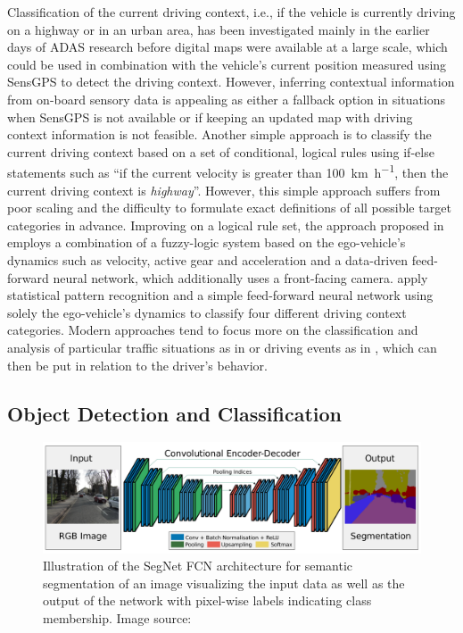Classification of the current driving context, i.e., if the vehicle is currently driving on a highway or in an urban area, has been investigated mainly in the earlier days of \ac{ADAS} research before digital maps were available at a large scale, which could be used in combination with the vehicle's current position measured using \ac{SensGPS} to detect the driving context.
However, inferring contextual information from on-board sensory data is appealing as either a fallback option in situations when \ac{SensGPS} is not available or if keeping an updated map with driving context information is not feasible.
Another simple approach is to classify the current driving context based on a set of conditional, logical rules using if-else statements such as \enquote{if the current velocity is greater than \SI{100}{\kilo\meter\per\hour}, then the current driving context is \emph{highway}}.
However, this simple approach suffers from poor scaling and the difficulty to formulate exact definitions of all possible target categories in advance.
Improving on a logical rule set, the approach proposed in \textcite{Hauptmann1996} employs a combination of a fuzzy-logic system based on the ego-vehicle's dynamics such as velocity, active gear and acceleration and a data-driven feed-forward neural network, which additionally uses a front-facing camera.
\textcite{Engstrom2001} apply statistical pattern recognition and a simple feed-forward neural network using solely the ego-vehicle's dynamics to classify four different driving context categories.
Modern approaches tend to focus more on the classification and analysis of particular traffic situations  as in \textcite{Hermann2008} or driving events as in \textcite{Dagostino2013}, which can then be put in relation to the driver's behavior.

\subsection{Object Detection and Classification}
\label{subsec:obj_detect}

\begin{figure}[t!]
    \centering
    \includegraphics[width=0.95\linewidth]{imgs/segnet.png}
    \caption{Illustration of the SegNet \acf{FCN} architecture for semantic segmentation of an image visualizing the input data as well as the output of the network with pixel-wise labels indicating class membership. Image source: \textcite{Badrinarayanan2015}}
    \label{fig:segnet_achitecture}
\end{figure}

